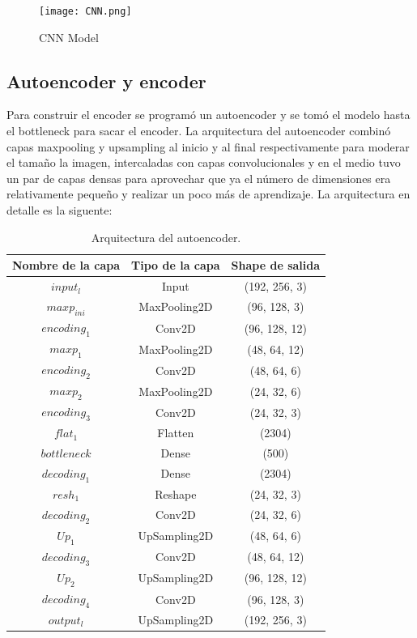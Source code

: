 \documentclass[colorinlistoftodos,twoside,twocolumn,10pt]{article} %
\begin{document}
\begin{figure}[h!] %
	\centering
	\texttt{[image: CNN.png]}
	\caption{CNN Model}
\end{figure}
\subsection {Autoencoder y encoder}
Para construir el encoder se program\'o un autoencoder y se tom\'o el modelo hasta el bottleneck para sacar el encoder. La arquitectura del autoencoder combin\'o capas maxpooling y upsampling al inicio y al final respectivamente para moderar el tama\~no la imagen, intercaladas con capas convolucionales y en el medio tuvo un par de capas densas para aprovechar que ya el n\'umero de dimensiones era relativamente peque\~no y realizar un poco m\'as de aprendizaje. La arquitectura en detalle es la siguente:
\begin{table}[h!]
	\begin{center}
		\begin{tabular}{ | c | c | c |}
			\hline
			\textbf{Nombre de la capa} & \textbf{Tipo de la capa} & \textbf{Shape de salida} \\ \hline
			$input_l$ & Input & (192, 256, 3) \\ \hline
			$maxp_{ini}$ & MaxPooling2D & (96, 128, 3) \\ \hline
			$encoding_1$ & Conv2D & (96, 128, 12) \\ \hline
			$maxp_1$ & MaxPooling2D & (48, 64, 12) \\ \hline
			$encoding_2$ & Conv2D & (48, 64, 6) \\ \hline
			$maxp_2$ & MaxPooling2D & (24, 32, 6) \\ \hline
			$encoding_3$ & Conv2D & (24, 32, 3) \\ \hline
			$flat_1$ & Flatten & (2304) \\ \hline
			$bottleneck$ & Dense & (500) \\ \hline
			$decoding_1$ & Dense & (2304) \\ \hline
			$resh_1$ & Reshape & (24, 32, 3) \\ \hline
			$decoding_2$ & Conv2D & (24, 32, 6) \\ \hline
			$Up_1$ & UpSampling2D & (48, 64, 6) \\ \hline
			$decoding_3$ & Conv2D & (48, 64, 12) \\ \hline
			$Up_2$ & UpSampling2D & (96, 128, 12) \\ \hline
			$decoding_4$ & Conv2D & (96, 128, 3) \\ \hline
			$output_l$ & UpSampling2D & (192, 256, 3) \\
			\hline
		\end{tabular}
		\caption{Arquitectura del autoencoder.}
		\label{tabla:2}
	\end{center}
\end{table}
\end{document}
